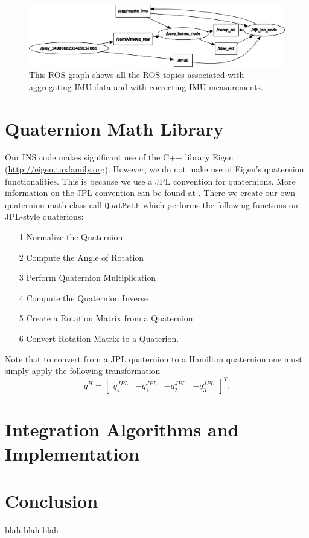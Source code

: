 \documentclass[11pt,a4paper]{article}
\begin{document}
\begin{figure}
	\centering
	\includegraphics[scale=0.42]{withonlinebias}
	\caption{This ROS graph shows all the ROS topics associated with aggregating IMU data and with correcting IMU measurements.}
	\label{fig:withonlinebias}
\end{figure}

\section{Quaternion Math Library}

Our INS code makes significant use of the C++ library Eigen (\url{http://eigen.tuxfamily.org}). However, we do not make use of Eigen's quaternion functionalities. This is because we use a JPL convention for quaternions. More information on the JPL convention can be found at \cite{Trawny:2005,Barfoot:2011,Wie:2008}. There we create our own quaternion math class call $\texttt{QuatMath}$ which performs the following functions on JPL-style quaterions:
\begin{itemize}
	\item[1] Normalize the Quaternion
	\item[2] Compute the Angle of Rotation
	\item[3] Perform Quaternion Multiplication
	\item[4] Compute the Quaternion Inverse
	\item[5] Create a Rotation Matrix from a Quaternion
	\item[6] Convert Rotation Matrix to a Quaterion.
\end{itemize}
Note that to convert from a JPL quaternion to a Hamilton quaternion one must simply apply the following transformation
\begin{equation}
	q^{H}  = \left[\begin{array}{cccc} q^{JPL}_4 & -q^{JPL}_1  & -q^{JPL}_2  & -q^{JPL}_3 \end{array}\right]^T.
\end{equation}

\section{Integration Algorithms and Implementation}

\section{Conclusion}

blah blah blah \cite{Forster:2017,Forster:2015,Eckenhoff:2016}



\end{document}
